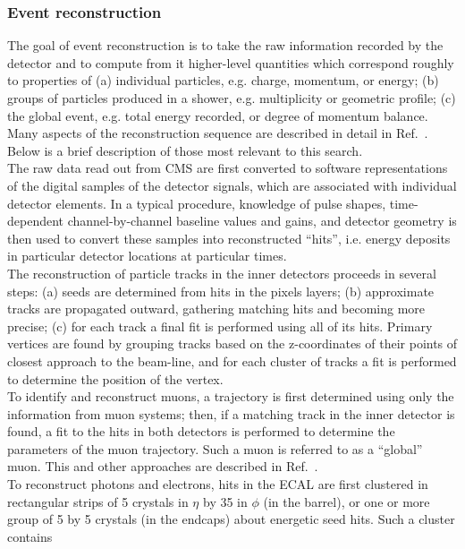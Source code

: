 \subsubsection{Event reconstruction}

The goal of event reconstruction is to take the raw information recorded by the
detector and to compute from it higher-level quantities which correspond roughly to
properties of (a) individual particles, e.g. charge, momentum, or energy; (b) groups
of particles produced in a shower, e.g. multiplicity or geometric proﬁle; (c) the global
event, e.g. total energy recorded, or degree of momentum balance. Many aspects of
the reconstruction sequence are described in detail in Ref.~\cite{Bayatian:922757,Bayatian:942733}. 
Below is a brief description of those most relevant to this search.\\
\indent The raw data read out from CMS are first converted to software representations
of the digital samples of the detector signals, which are associated with individual
detector elements. In a typical procedure, knowledge of pulse shapes, time-dependent
channel-by-channel baseline values and gains, and detector geometry is then used to
convert these samples into reconstructed ``hits'', i.e. energy deposits in particular
detector locations at particular times.\\
\indent The reconstruction of particle tracks in the inner detectors proceeds in several
steps: (a) seeds are determined from hits in the pixels layers; (b) approximate tracks
are propagated outward, gathering matching hits and becoming more precise; (c) for
each track a final fit is performed using all of its hits. Primary vertices are found by
grouping tracks based on the z-coordinates of their points of closest approach to the
beam-line, and for each cluster of tracks a fit is performed to determine the position
of the vertex. \\ 
\indent To identify and reconstruct muons, a trajectory is first determined using only the
information from muon systems; then, if a matching track in the inner detector is
found, a fit to the hits in both detectors is performed to determine the parameters of
the muon trajectory. Such a muon is referred to as a “global” muon. This and other
approaches are described in Ref.~\cite{PAS-MUO-10-002}. \\
\indent To reconstruct photons and electrons, hits in the ECAL are ﬁrst clustered in
rectangular strips of 5 crystals in $\eta$ by 35 in $\phi$ (in the barrel), or one or more group
of 5 by 5 crystals (in the endcaps) about energetic seed hits. Such a cluster contains
